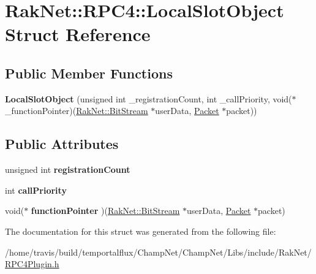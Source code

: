 \hypertarget{struct_rak_net_1_1_r_p_c4_1_1_local_slot_object}{\section{Rak\-Net\-:\-:R\-P\-C4\-:\-:Local\-Slot\-Object Struct Reference}
\label{struct_rak_net_1_1_r_p_c4_1_1_local_slot_object}
}
\subsection*{Public Member Functions}
\begin{DoxyCompactItemize}
\item 
\hypertarget{struct_rak_net_1_1_r_p_c4_1_1_local_slot_object_a5a967af16e9147411d8c403c7e6c1e42}{{\bfseries Local\-Slot\-Object} (unsigned int \-\_\-registration\-Count, int \-\_\-call\-Priority, void($\ast$\-\_\-function\-Pointer)(\hyperlink{class_rak_net_1_1_bit_stream}{Rak\-Net\-::\-Bit\-Stream} $\ast$user\-Data, \hyperlink{struct_rak_net_1_1_packet}{Packet} $\ast$packet))}\label{struct_rak_net_1_1_r_p_c4_1_1_local_slot_object_a5a967af16e9147411d8c403c7e6c1e42}

\end{DoxyCompactItemize}
\subsection*{Public Attributes}
\begin{DoxyCompactItemize}
\item 
\hypertarget{struct_rak_net_1_1_r_p_c4_1_1_local_slot_object_aed6fa4cc2e64a7375c0ee6a36cb88686}{unsigned int {\bfseries registration\-Count}}\label{struct_rak_net_1_1_r_p_c4_1_1_local_slot_object_aed6fa4cc2e64a7375c0ee6a36cb88686}

\item 
\hypertarget{struct_rak_net_1_1_r_p_c4_1_1_local_slot_object_ae7a7deb1ecc7175e440a38993a87f1e1}{int {\bfseries call\-Priority}}\label{struct_rak_net_1_1_r_p_c4_1_1_local_slot_object_ae7a7deb1ecc7175e440a38993a87f1e1}

\item 
\hypertarget{struct_rak_net_1_1_r_p_c4_1_1_local_slot_object_a2c60fb69f1457f6b5732c48d149c4580}{void($\ast$ {\bfseries function\-Pointer} )(\hyperlink{class_rak_net_1_1_bit_stream}{Rak\-Net\-::\-Bit\-Stream} $\ast$user\-Data, \hyperlink{struct_rak_net_1_1_packet}{Packet} $\ast$packet)}\label{struct_rak_net_1_1_r_p_c4_1_1_local_slot_object_a2c60fb69f1457f6b5732c48d149c4580}

\end{DoxyCompactItemize}


The documentation for this struct was generated from the following file\-:\begin{DoxyCompactItemize}
\item 
/home/travis/build/temportalflux/\-Champ\-Net/\-Champ\-Net/\-Libs/include/\-Rak\-Net/\hyperlink{_r_p_c4_plugin_8h}{R\-P\-C4\-Plugin.\-h}\end{DoxyCompactItemize}
